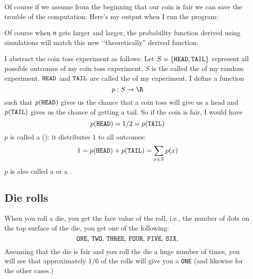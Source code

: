 Of course if we assume from the beginning that our coin is fair we can 
save the trouble of the computation:
Here's my output when I run the program:


Of course when \verb!n! gets larger and larger, the probability function
derived using simulations will match this new \lq\lq theoretically'' derived
function.





I abstract the coin toss experiment as follows:
Let $S = \{\texttt{HEAD}, \texttt{TAIL}\}$ represent all possible outcomes of
my coin toss experiment.
$S$ is the called the  of my random experiment.
$\texttt{HEAD}$ and $\texttt{TAIL}$ are called
the  of my experiment.
I define a function
\[
  p : S \rightarrow \R 
\]
such that $p(\texttt{HEAD})$ gives us the chance that
a coin toss will give us a head and
$p(\texttt{TAIL})$ gives us the chance of getting a tail.
So if the coin is fair, I would have
\[
  p(\texttt{HEAD}) = 1/2 = p(\texttt{TAIL})
\]
$p$ is called a
():
it distributes $1$ to all outcomes:
\[
1 = p(\texttt{HEAD}) + p(\texttt{TAIL}) = \sum_{x \in S} p(x)
\]
$p$ is also called a
or a 
.




\newpage
\subsection{Die rolls}

When you roll a die, you get the face value of the roll, i.e.,
the number of dots on the top surface of the die, you
get one of the following:
\[
\text{
\texttt{ONE},
\texttt{TWO},
\texttt{THREE},
\texttt{FOUR},
\texttt{FIVE},
\texttt{SIX},
}
\]
Assuming that the die is fair and you roll the die a huge
number of times, you will see that approximately 1/6 of the 
rolls will give you a \texttt{ONE}
(and likewise for the other cases.)

